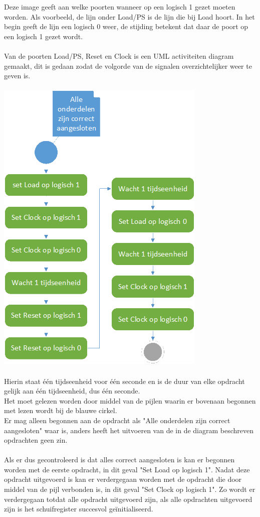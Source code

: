Deze image geeft aan welke poorten wanneer op een logisch 1 gezet moeten worden. Als voorbeeld, de lijn onder Load/PS is de lijn die bij Load hoort. In het begin geeft de lijn een logisch 0 weer, de stijding betekent dat daar de poort op een logisch 1 gezet wordt.
\\\\
Van de poorten Load/PS, Reset en Clock is een UML activiteiten diagram gemaakt, dit is gedaan zodat de volgorde van de signalen overzichtelijker weer te geven is.
\\\\
\includegraphics[scale=0.8]{./img/activity.png}
\\\\
Hierin staat één tijdseenheid voor één seconde en is de duur van elke opdracht gelijk aan één tijdseenheid, dus één seconde.\\
Het moet gelezen worden door middel van de pijlen waarin er bovenaan begonnen met lezen wordt bij de blauwe cirkel.\\
Er mag alleen begonnen aan de opdracht als "Alle onderdelen zijn correct aangesloten" waar is, anders heeft het uitvoeren van de in de diagram beschreven opdrachten geen zin.
\\\\
Als er dus gecontroleerd is dat alles correct aangesloten is kan er begonnen worden met de eerste opdracht, in dit geval "Set Load op logisch 1". Nadat deze opdracht uitgevoerd is kan er verdergegaan worden met de opdracht die door middel van de pijl verbonden is, in dit geval "Set Clock op logisch 1". Zo wordt er verdergegaan totdat alle opdracht uitgevoerd zijn, als alle opdrachten uitgevoerd zijn is het schuifregister succesvol geïnitialiseerd.
\newpage
